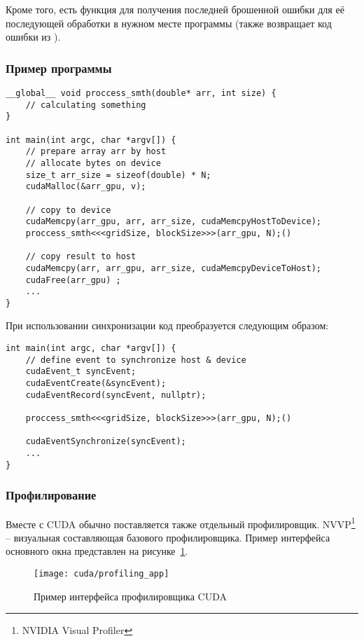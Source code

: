 Кроме того, есть функция для получения последней брошенной ошибки для её последующей обработки в нужном месте программы (также возвращает код ошибки из ).


\subsubsection*{Пример программы}
\begin{verbatim}
__global__ void proccess_smth(double* arr, int size) { 
    // calculating something
}

int main(int argc, char *argv[]) {
    // prepare array arr by host
    // allocate bytes on device
    size_t arr_size = sizeof(double) * N;
    cudaMalloc(&arr_gpu, v);
    
    // copy to device
    cudaMemcpy(arr_gpu, arr, arr_size, cudaMemcpyHostToDevice);
    proccess_smth<<<gridSize, blockSize>>>(arr_gpu, N);()
    
    // copy result to host
    cudaMemcpy(arr, arr_gpu, arr_size, cudaMemcpyDeviceToHost); 
    cudaFree(arr_gpu) ;
    ...
}
\end{verbatim}

При использовании синхронизации код преобразуется следующим образом:
\begin{verbatim}
int main(int argc, char *argv[]) {
    // define event to synchronize host & device 
    cudaEvent_t syncEvent;
    cudaEventCreate(&syncEvent); 
    cudaEventRecord(syncEvent, nullptr);
    
    proccess_smth<<<gridSize, blockSize>>>(arr_gpu, N);()
    
    cudaEventSynchronize(syncEvent);
    ... 
}
\end{verbatim}

\subsubsection*{Профилирование}
Вместе с CUDA обычно поставляется также отдельный профилировщик. NVVP\footnote{NVIDIA Visual Profiler} -- визуальная составляющая базового профилировщика. Пример интерфейса основного окна представлен на рисунке~\ref{CudaProfiling:image}.

\begin{figure}[H]
    \texttt{[image: cuda/profiling\_app]}
    \caption{Пример интерфейса профилировщика CUDA}
    \label{CudaProfiling:image}
\end{figure}

